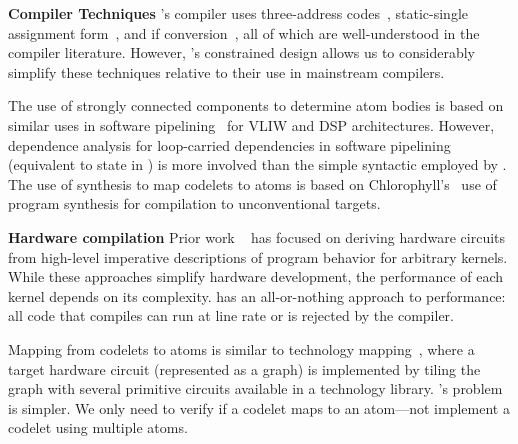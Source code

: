 \textbf{Compiler Techniques}
\pktlanguage's compiler uses three-address codes~\cite{tac}, static-single
assignment form~\cite{ssa}, and if conversion~\cite{if_conversion}, all of
which are well-understood in the compiler literature. However, \pktlanguage's
constrained design allows us to considerably simplify these techniques relative
to their use in mainstream compilers.

The use of strongly connected components to determine atom bodies is based on
similar uses in software pipelining~\cite{software_pipelining} for VLIW and DSP
architectures. However, dependence analysis for loop-carried dependencies in
software pipelining (equivalent to state in \pktlanguage) is more involved than
the simple syntactic employed by \pktlanguage. The use of synthesis to map
codelets to atoms is based on Chlorophyll's~\cite{chlorophyll} use of program
synthesis for compilation to unconventional targets.

\textbf{Hardware compilation}
Prior work ~\cite{nurvadathi, cash, bluespec} has focused on deriving hardware
circuits from high-level imperative descriptions of program behavior for
arbitrary kernels. While these approaches simplify hardware development, the
performance of each kernel depends on its complexity.  \pktlanguage has an
all-or-nothing approach to performance: all code that compiles can run at
line rate or is rejected by the compiler.

Mapping from codelets to atoms is similar to technology mapping~\cite{micheli,
flowmap, spectransform}, where a target hardware circuit (represented as a
graph) is implemented by tiling the graph with several primitive circuits
available in a technology library. \pktlanguage's problem is simpler. We only
need to verify if a codelet maps to an atom---not implement a codelet using
multiple atoms.
